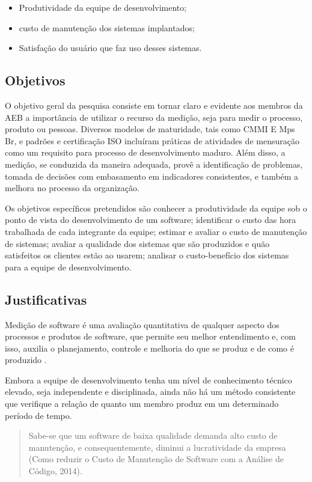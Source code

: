 	\begin{itemize}
		\item{Produtividade da equipe de desenvolvimento;}
		\item{custo de manutenção dos sistemas implantados;}
		\item{Satisfação do usuário que faz uso desses sistemas.}
	\end{itemize}

\subsection{Objetivos}

	O objetivo geral da pesquisa consiste em tornar claro e evidente aos membros da AEB a importância de utilizar o recurso da medição, seja para medir o processo, produto ou pessoas. Diversos modelos de maturidade, tais como CMMI E Mps Br, e padrões e certificação ISO incluíram práticas de atividades de mensuração como um requisito para processo de desenvolvimento maduro. Além disso, a medição, se conduzida da maneira adequada, provê a identificação de problemas, tomada de decisões com embasamento em indicadores consistentes, e também a melhora no processo da organização.

	Os objetivos específicos pretendidos são conhecer a produtividade da equipe sob o ponto de vista do desenvolvimento de um software; identificar o custo das hora trabalhada de cada integrante da equipe; estimar e avaliar o custo de manutenção de sistemas; avaliar a qualidade dos sistemas que são produzidos e quão satisfeitos os clientes estão ao usarem; analisar o custo-benefício dos sistemas para a equipe de desenvolvimento.


\subsection{Justificativas}

	Medição de software é uma avaliação quantitativa de qualquer aspecto dos processos e produtos de software, que permite seu melhor entendimento e, com isso, auxilia o planejamento, controle e melhoria do que se produz e de como é produzido \cite{bass1999constructing}.

	Embora a equipe de desenvolvimento tenha um nível de conhecimento técnico elevado, seja independente e disciplinada, ainda não há um método consistente que verifique a relação de quanto um membro produz em um determinado período de tempo.

	\begin{quote}
		Sabe-se que um software de baixa qualidade demanda alto custo de manutenção, e consequentemente, diminui a lucratividade da empresa (Como reduzir o Custo de Manutenção de Software com a Análise de Código, 2014).
	\end{quote}


